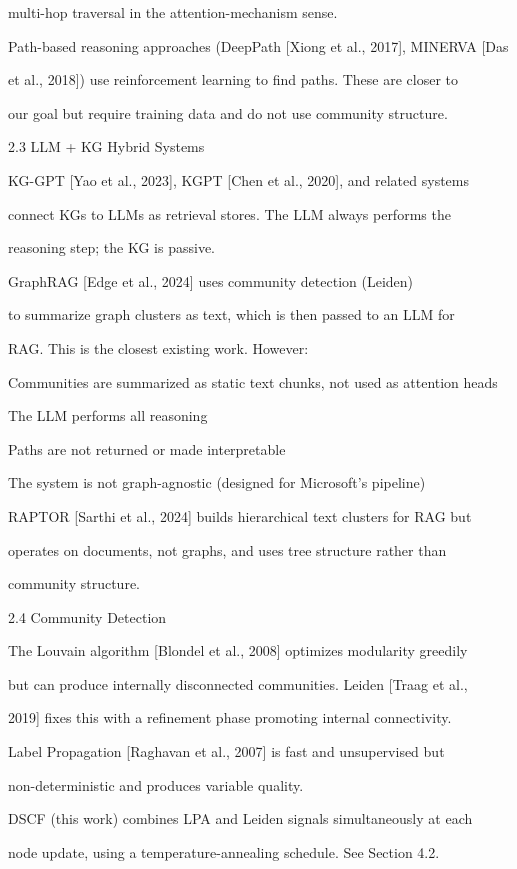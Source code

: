 \documentclass[10pt,journal,compsoc]{IEEEtran}
\begin{document}
multi-hop traversal in the attention-mechanism sense.

Path-based reasoning approaches (DeepPath [Xiong et al., 2017], MINERVA [Das

et al., 2018]) use reinf\-orcement learning to find paths. These are closer to

our goal but require training data and do not use community structure.

2.3 LLM + KG Hybrid Systems

KG-GPT [Yao et al., 2023], KGPT [Chen et al., 2020], and related systems

connect KGs to LLMs as retrieval stores. The LLM always performs the

reasoning step; the KG is passive.

GraphRAG [Edge et al., 2024] uses community detection (Leiden)

to summarize graph clusters as text, which is then passed to an LLM for

RAG. This is the closest existing work. However:

Communities are summarized as static text chunks, not used as attention heads

The LLM performs all reasoning

Paths are not returned or made inter\-pretable

The system is not graph-agnostic (designed for Microsoft's pipeline)

RAPTOR [Sarthi et al., 2024] builds hiera\-rchical text clusters for RAG but

operates on documents, not graphs, and uses tree structure rather than

community structure.

2.4 Community Detection

The Louvain algorithm [Blondel et al., 2008] optimizes modularity greedily

but can produce internally disco\-nnected communities. Leiden [Traag et al.,

2019] fixes this with a refinement phase promoting internal conne\-ctivity.

Label Propagation [Raghavan et al., 2007] is fast and unsup\-ervised but

non-deter\-ministic and produces variable quality.

DSCF (this work) combines LPA and Leiden signals simul\-taneously at each

node update, using a temperature-annealing schedule. See Section 4.2.
\end{document}
